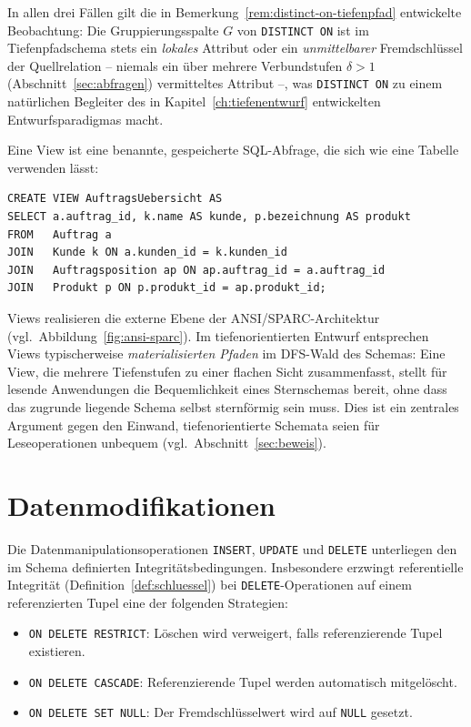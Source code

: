 ﻿\documentclass[a4paper,12pt]{report}
\theoremstyle{definition}
\theoremstyle{remark}
\begin{document}
In allen drei Fällen gilt die in
Bemerkung~\ref{rem:distinct-on-tiefenpfad} entwickelte
Beobachtung: Die Gruppierungsspalte $G$ von \texttt{DISTINCT ON} ist
im Tiefenpfadschema stets ein \emph{lokales} Attribut oder ein
\emph{unmittelbarer} Fremdschlüssel der Quellrelation -- niemals ein
über mehrere Verbundstufen $\delta>1$ (Abschnitt~\ref{sec:abfragen})
vermitteltes Attribut --, was \texttt{DISTINCT ON} zu einem
natürlichen Begleiter des in Kapitel~\ref{ch:tiefenentwurf}
entwickelten Entwurfsparadigmas macht.



Eine View ist eine benannte, gespeicherte SQL-Abfrage, die sich wie eine
Tabelle verwenden lässt:

\begin{lstlisting}
CREATE VIEW AuftragsUebersicht AS
SELECT a.auftrag_id, k.name AS kunde, p.bezeichnung AS produkt
FROM   Auftrag a
JOIN   Kunde k ON a.kunden_id = k.kunden_id
JOIN   Auftragsposition ap ON ap.auftrag_id = a.auftrag_id
JOIN   Produkt p ON p.produkt_id = ap.produkt_id;
\end{lstlisting}

Views realisieren die externe Ebene der ANSI/SPARC-Architektur (vgl.\
Abbildung~\ref{fig:ansi-sparc}). Im tiefenorientierten Entwurf
entsprechen Views typischerweise \emph{materialisierten Pfaden} im
DFS-Wald des Schemas: Eine View, die mehrere Tiefenstufen zu einer
flachen Sicht zusammenfasst, stellt für lesende Anwendungen die
Bequemlichkeit eines Sternschemas bereit, ohne dass das zugrunde
liegende Schema selbst sternförmig sein muss. Dies ist ein zentrales
Argument gegen den Einwand, tiefenorientierte Schemata seien für
Leseoperationen unbequem (vgl.\ Abschnitt~\ref{sec:beweis}).

\section{Datenmodifikationen}

Die Datenmanipulationsoperationen \texttt{INSERT}, \texttt{UPDATE} und
\texttt{DELETE} unterliegen den im Schema definierten
Integritätsbedingungen. Insbesondere erzwingt referentielle Integrität
(Definition~\ref{def:schluessel}) bei \texttt{DELETE}-Operationen auf
einem referenzierten Tupel eine der folgenden Strategien:

\begin{itemize}
  \item \texttt{ON DELETE RESTRICT}: Löschen wird verweigert, falls
    referenzierende Tupel existieren.
  \item \texttt{ON DELETE CASCADE}: Referenzierende Tupel werden
    automatisch mitgelöscht.
  \item \texttt{ON DELETE SET NULL}: Der Fremdschlüsselwert wird auf
    \texttt{NULL} gesetzt.
\end{itemize}
\end{document}
